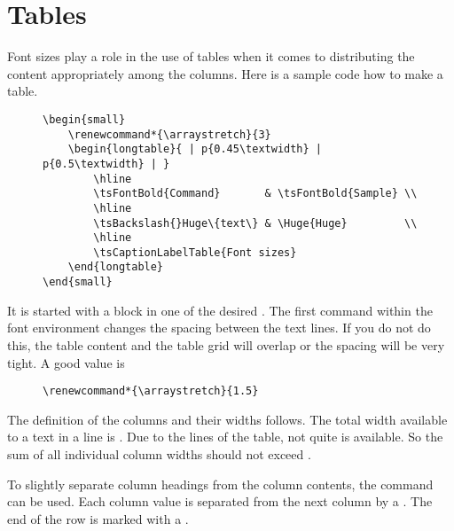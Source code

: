 \section{Tables}

Font sizes play a role in the use of tables when it comes to distributing
the content appropriately among the columns. Here is a sample code how to
make a table.

\begin{figure}[H]
    \small
    \centering
    \begin{BVerbatim}
\begin{small}
    \renewcommand*{\arraystretch}{3}
    \begin{longtable}{ | p{0.45\textwidth} | p{0.5\textwidth} | }
        \hline
        \tsFontBold{Command}       & \tsFontBold{Sample} \\
        \hline
        \tsBackslash{}Huge\{text\} & \Huge{Huge}         \\
        \hline
        \tsCaptionLabelTable{Font sizes}
    \end{longtable}
\end{small}
    \end{BVerbatim}
\end{figure}

It is started with a block in one of the desired .
The first command within the font environment changes the spacing between the
text lines. If you do not do this, the table content and the table grid will
overlap or the spacing will be very tight. A good value is

\begin{figure}[H]
    \small
    \centering
    \begin{BVerbatim}
\renewcommand*{\arraystretch}{1.5}
    \end{BVerbatim}
\end{figure}

The definition of the columns and their widths follows. The total width
available to a text in a line is . Due
to the lines of the table, not quite 
is available. So the sum of all individual column widths should not exceed
.
\bigbreak

To slightly separate column headings from the column contents, the\linebreak
{} command can be used. Each
column value is separated from the next column by a \tsFontCode{\&}. The end
of the row is marked with a \tsFontCode{\tsBackslash{}\tsBackslash{}}.
\bigbreak

